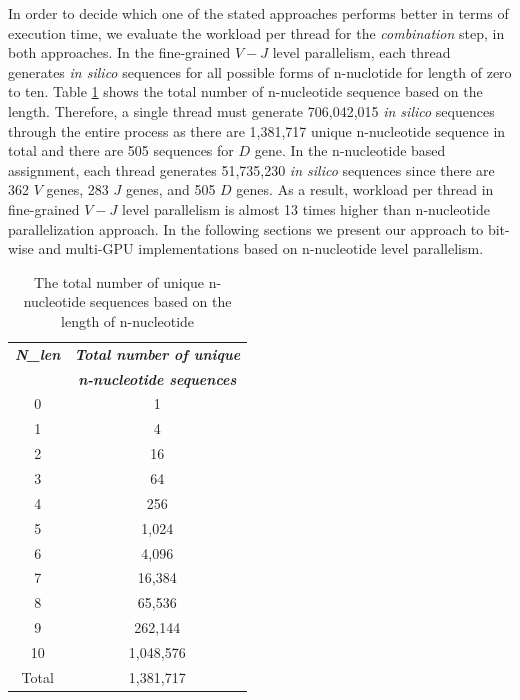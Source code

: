 In order to decide which one of the stated approaches performs better in terms of execution time, we evaluate the workload per thread for the \emph{combination} step, in both approaches. In the fine-grained $V-J$ level parallelism, each thread generates \emph{in silico} sequences for all possible forms of n-nuclotide for length of zero to ten. Table \ref{tab:n-table} shows the total number of n-nucleotide sequence based on the length. Therefore, a single thread must generate 706,042,015 \emph{in silico} sequences through the entire process as there are 1,381,717 unique n-nucleotide sequence in total and there are 505 sequences for $D$ gene. In the n-nucleotide based assignment, each thread generates 51,735,230 \emph{in silico} sequences since there are 362 $V$ genes, 283 $J$ genes, and 505 $D$ genes. As a result, workload per thread in fine-grained $V-J$ level parallelism is almost 13 times higher than n-nucleotide parallelization approach. In the following sections we present our approach to bit-wise and multi-GPU implementations based on n-nucleotide level parallelism. 



\begin{table}[t!]
\caption{The total number of unique n-nucleotide sequences based on the length of n-nucleotide}

\renewcommand{\arraystretch}{1.2}
\begin{center}
\begin{tabular}{ |c|c| }
  \hline
    \textbf{\textit{ N\_{len} }} & \textbf{\textit{Total number of unique}}\\
    ~ &  \textbf{\textit{n-nucleotide sequences}}\\	\hline	
    0 & 1  	\\	\hline
    1 & 4 		\\	\hline
   	2 & 16 \\	\hline
    3 & 64 	\\	\hline
    4 & 256 	\\	\hline
    5 & 1,024  	\\	\hline
    6 & 4,096 	\\	\hline
   	7 & 16,384  	\\	\hline
    8 & 65,536 \\	\hline
    9 & 262,144   \\	\hline
    10 & 1,048,576 \\	\hline
    Total & 1,381,717 \\
  \hline
\end{tabular}

  \label{tab:n-table}
\end{center}

\end{table}




